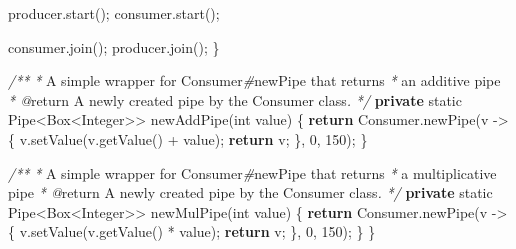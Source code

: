 \documentclass[11pt]{article}
\newenvironment{Shaded}{}{}
\newcommand{\KeywordTok}[1]{\textcolor[rgb]{0.00,0.44,0.13}{\textbf{{#1}}}}
\newcommand{\DataTypeTok}[1]{\textcolor[rgb]{0.56,0.13,0.00}{{#1}}}
\newcommand{\DecValTok}[1]{\textcolor[rgb]{0.25,0.63,0.44}{{#1}}}
\newcommand{\CommentTok}[1]{\textcolor[rgb]{0.38,0.63,0.69}{\textit{{#1}}}}
\newcommand{\FunctionTok}[1]{\textcolor[rgb]{0.02,0.16,0.49}{{#1}}}
\newcommand{\NormalTok}[1]{{#1}}
\newcommand{\ControlFlowTok}[1]{\textcolor[rgb]{0.00,0.44,0.13}{\textbf{{#1}}}}
\newcommand{\OperatorTok}[1]{\textcolor[rgb]{0.40,0.40,0.40}{{#1}}}
\newcommand{\BuiltInTok}[1]{{#1}}
\begin{document}
\begin{Shaded}
\begin{Highlighting}[]
\NormalTok{        producer}\OperatorTok{.}\FunctionTok{start}\OperatorTok{();}
\NormalTok{        consumer}\OperatorTok{.}\FunctionTok{start}\OperatorTok{();}

\NormalTok{        consumer}\OperatorTok{.}\FunctionTok{join}\OperatorTok{();}
\NormalTok{        producer}\OperatorTok{.}\FunctionTok{join}\OperatorTok{();}
    \OperatorTok{\}}

    \CommentTok{/**}
     \CommentTok{*}\NormalTok{ A simple wrapper for }\CommentTok{\textasciigrave{}}\NormalTok{Consumer}\CommentTok{\#}\NormalTok{newPipe}\CommentTok{\textasciigrave{}}\NormalTok{ that returns}
     \CommentTok{*}\NormalTok{ an additive pipe}
\CommentTok{     * @}\NormalTok{return A newly created pipe by the }\CommentTok{\textasciigrave{}}\NormalTok{Consumer}\CommentTok{\textasciigrave{}}\NormalTok{ class}\CommentTok{.}
     \CommentTok{*/}
    \KeywordTok{private} \DataTypeTok{static} \BuiltInTok{Pipe}\OperatorTok{\textless{}}\BuiltInTok{Box}\OperatorTok{\textless{}}\BuiltInTok{Integer}\OperatorTok{\textgreater{}\textgreater{}} \FunctionTok{newAddPipe}\OperatorTok{(}\DataTypeTok{int}\NormalTok{ value}\OperatorTok{)} \OperatorTok{\{}
        \ControlFlowTok{return}\NormalTok{ Consumer}\OperatorTok{.}\FunctionTok{newPipe}\OperatorTok{(}\NormalTok{v }\OperatorTok{{-}\textgreater{}} \OperatorTok{\{}
\NormalTok{            v}\OperatorTok{.}\FunctionTok{setValue}\OperatorTok{(}\NormalTok{v}\OperatorTok{.}\FunctionTok{getValue}\OperatorTok{()} \OperatorTok{+}\NormalTok{ value}\OperatorTok{);}
            \ControlFlowTok{return}\NormalTok{ v}\OperatorTok{;}
        \OperatorTok{\},} \DecValTok{0}\OperatorTok{,} \DecValTok{150}\OperatorTok{);}
    \OperatorTok{\}}

    \CommentTok{/**}
     \CommentTok{*}\NormalTok{ A simple wrapper for }\CommentTok{\textasciigrave{}}\NormalTok{Consumer}\CommentTok{\#}\NormalTok{newPipe}\CommentTok{\textasciigrave{}}\NormalTok{ that returns}
     \CommentTok{*}\NormalTok{ a multiplicative pipe}
\CommentTok{     * @}\NormalTok{return A newly created pipe by the }\CommentTok{\textasciigrave{}}\NormalTok{Consumer}\CommentTok{\textasciigrave{}}\NormalTok{ class}\CommentTok{.}
     \CommentTok{*/}
    \KeywordTok{private} \DataTypeTok{static} \BuiltInTok{Pipe}\OperatorTok{\textless{}}\BuiltInTok{Box}\OperatorTok{\textless{}}\BuiltInTok{Integer}\OperatorTok{\textgreater{}\textgreater{}} \FunctionTok{newMulPipe}\OperatorTok{(}\DataTypeTok{int}\NormalTok{ value}\OperatorTok{)} \OperatorTok{\{}
        \ControlFlowTok{return}\NormalTok{ Consumer}\OperatorTok{.}\FunctionTok{newPipe}\OperatorTok{(}\NormalTok{v }\OperatorTok{{-}\textgreater{}} \OperatorTok{\{}
\NormalTok{            v}\OperatorTok{.}\FunctionTok{setValue}\OperatorTok{(}\NormalTok{v}\OperatorTok{.}\FunctionTok{getValue}\OperatorTok{()} \OperatorTok{*}\NormalTok{ value}\OperatorTok{);}
            \ControlFlowTok{return}\NormalTok{ v}\OperatorTok{;}
        \OperatorTok{\},} \DecValTok{0}\OperatorTok{,} \DecValTok{150}\OperatorTok{);}
    \OperatorTok{\}}
\OperatorTok{\}}
\end{Highlighting}
\end{Shaded}
\end{document}
